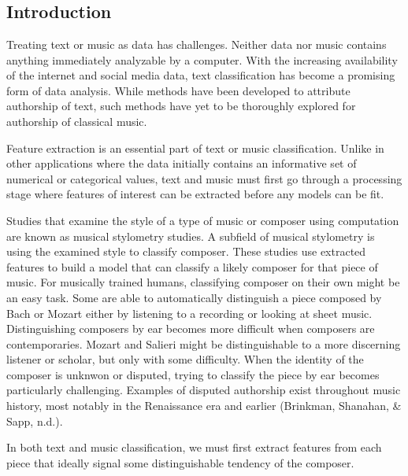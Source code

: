 \documentclass[12pt,twoside]{reedthesis}
\theoremstyle{definition}
\theoremstyle{definition}
\theoremstyle{definition}
\theoremstyle{remark}
\begin{document}
\mainmatter %
\pagestyle{fancyplain} %

\chapter{}\label{section}

\section{Introduction}\label{introduction}

Treating text or music as data has challenges. Neither data nor music
contains anything immediately analyzable by a computer. With the
increasing availability of the internet and social media data, text
classification has become a promising form of data analysis. While
methods have been developed to attribute authorship of text, such
methods have yet to be thoroughly explored for authorship of classical
music.

Feature extraction is an essential part of text or music classification.
Unlike in other applications where the data initially contains an
informative set of numerical or categorical values, text and music must
first go through a processing stage where features of interest can be
extracted before any models can be fit.

Studies that examine the style of a type of music or composer using
computation are known as musical stylometry studies. A subfield of
musical stylometry is using the examined style to classify composer.
These studies use extracted features to build a model that can classify
a likely composer for that piece of music. For musically trained humans,
classifying composer on their own might be an easy task. Some are able
to automatically distinguish a piece composed by Bach or Mozart either
by listening to a recording or looking at sheet music. Distinguishing
composers by ear becomes more difficult when composers are
contemporaries. Mozart and Salieri might be distinguishable to a more
discerning listener or scholar, but only with some difficulty. When the
identity of the composer is unknwon or disputed, trying to classify the
piece by ear becomes particularly challenging. Examples of disputed
authorship exist throughout music history, most notably in the
Renaissance era and earlier (Brinkman, Shanahan, \& Sapp, n.d.).

In both text and music classification, we must first extract features
from each piece that ideally signal some distinguishable tendency of the
composer.
\end{document}
